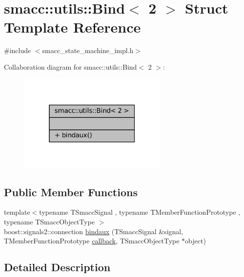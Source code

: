 \hypertarget{structsmacc_1_1utils_1_1Bind_3_012_01_4}{}\section{smacc\+:\+:utils\+:\+:Bind$<$ 2 $>$ Struct Template Reference}
\label{structsmacc_1_1utils_1_1Bind_3_012_01_4}


{\ttfamily \#include $<$smacc\+\_\+state\+\_\+machine\+\_\+impl.\+h$>$}



Collaboration diagram for smacc\+:\+:utils\+:\+:Bind$<$ 2 $>$\+:
\nopagebreak
\begin{figure}[H]
\begin{center}
\leavevmode
\includegraphics[width=211pt]{structsmacc_1_1utils_1_1Bind_3_012_01_4__coll__graph}
\end{center}
\end{figure}
\subsection*{Public Member Functions}
\begin{DoxyCompactItemize}
\item 
{\footnotesize template$<$typename T\+Smacc\+Signal , typename T\+Member\+Function\+Prototype , typename T\+Smacc\+Object\+Type $>$ }\\boost\+::signals2\+::connection \hyperlink{structsmacc_1_1utils_1_1Bind_3_012_01_4_aa9bba43cc8862f00155b17d2625bd99e}{bindaux} (T\+Smacc\+Signal \&signal, T\+Member\+Function\+Prototype \hyperlink{3_2servers_2opencv__perception__node_2opencv__perception__node_8cpp_a050e697bd654facce10ea3f6549669b3}{callback}, T\+Smacc\+Object\+Type $\ast$object)
\end{DoxyCompactItemize}


\subsection{Detailed Description}
